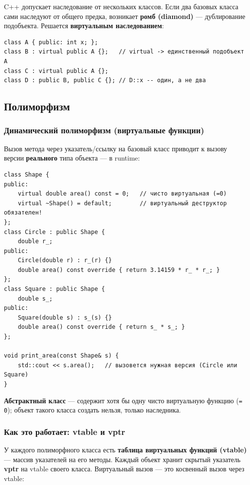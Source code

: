 C++ допускает наследование от нескольких классов. Если два базовых класса сами
наследуют от общего предка, возникает \textbf{ромб (diamond)} --- дублирование
подобъекта. Решается \textbf{виртуальным наследованием}:

\begin{lstlisting}
class A { public: int x; };
class B : virtual public A {};   // virtual -> единственный подобъект A
class C : virtual public A {};
class D : public B, public C {}; // D::x -- один, а не два
\end{lstlisting}

\subsection{Полиморфизм}

\subsubsection{Динамический полиморфизм (виртуальные функции)}

Вызов метода через указатель/ссылку на базовый класс приводит к вызову версии
\textbf{реального} типа объекта --- в runtime:

\begin{lstlisting}
class Shape {
public:
    virtual double area() const = 0;   // чисто виртуальная (=0)
    virtual ~Shape() = default;        // виртуальный деструктор обязателен!
};
class Circle : public Shape {
    double r_;
public:
    Circle(double r) : r_(r) {}
    double area() const override { return 3.14159 * r_ * r_; }
};
class Square : public Shape {
    double s_;
public:
    Square(double s) : s_(s) {}
    double area() const override { return s_ * s_; }
};

void print_area(const Shape& s) {
    std::cout << s.area();   // вызовется нужная версия (Circle или Square)
}
\end{lstlisting}

\textbf{Абстрактный класс} --- содержит хотя бы одну чисто виртуальную функцию
(\texttt{= 0}); объект такого класса создать нельзя, только наследника.

\subsubsection{Как это работает: vtable и vptr}

У каждого полиморфного класса есть \textbf{таблица виртуальных функций (vtable)}
--- массив указателей на его методы. Каждый объект хранит скрытый указатель
\textbf{vptr} на vtable своего класса. Виртуальный вызов --- это косвенный вызов
через vtable:

